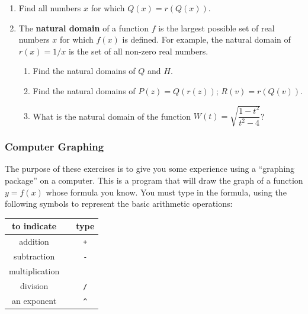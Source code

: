 \begin{enumerate}
\begin{enumerate}
  \item For all real numbers $a$ and $b$, $s(a+b) = s(a) + s(b)$.

  \item For all real numbers $a$, $b$, and $c$, $D(D(a,b),c)) = D(a,D(b,c))$.


\end{enumerate}
\item Find all numbers $x$ for which $Q(x) = r(Q(x))$.


\item The {\bf natural
  domain} of
a function $f$ is the largest possible set of real numbers $x$ for
which $f(x)$ is defined.  For example, the natural domain of $r(x) =
1/x$ is the set of all non-zero real numbers.

  \begin{enumerate}
  \item Find the natural domains of $Q$ and $H$.

  \item Find the natural domains of $P(z) = Q(r(z))$;
$R(v) = r(Q(v))$.

  \item What is the natural domain of the function $W(t) =
\sqrt{\dfrac{1 - t^2}{t^2 - 4}}$?


\end{enumerate}
\end{enumerate}
\subsubsection{Computer Graphing}
\label{subsubsec:computer-graphing}

The purpose of these exercises is to give you some experience using a
``graphing package'' on a computer.  This is a program that will draw
the graph of a function $y = f(x)$ whose formula you know.  You must
type in the formula, using the following symbols to represent the
basic arithmetic operations:

\begin{center}
	\begin{tabular}{ccc}
	to indicate & & type \\ \hline
	addition & \rule{0pt}{15pt} & {\tt +} \\
	subtraction & & {\tt -} \\
	multiplication & & {\tt *} \\
	division & & {\tt /} \\
	an exponent & & \verb+^+
	\end{tabular}
\end{center}


